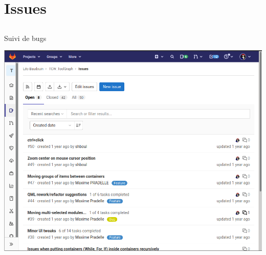 \documentclass{beamer}
\begin{document}
\section{Issues}
\subsection{}

\begin{frame}[fragile]{Suivi de bugs}
\begin{center}
\includegraphics[width=1.0\linewidth]{images/gitlab-issues}
\end{center}
\end{frame}


\end{document}
